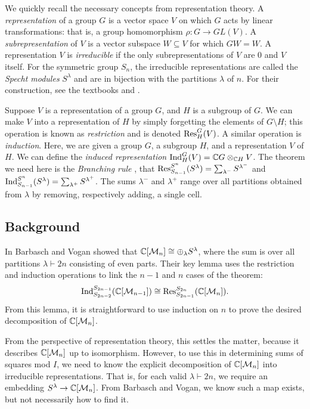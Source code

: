 We quickly recall the necessary concepts from representation theory.
A {\em representation} of a group $G$ is a vector space $V$ on which $G$ acts by linear transformations: that is, a group homomorphism $\rho: G \to GL(V)$.
A {\em subrepresentation} of $V$ is a vector subspace $W \subseteq V$ for which $GW = W$.
A representation $V$ is {\em irreducible} if the only subrepresentations of $V$ are 0 and $V$ itself.
For the symmetric group $S_n$, the irreducible representations are called the {\em Specht modules} $S^\lambda$ and are in bijection with the partitions $\lambda$ of $n$.
For their construction, see the textbooks \cite{Sagan} and \cite{Fulton}.

Suppose $V$ is a representation of a group $G$, and $H$ is a subgroup of $G$.
We can make $V$ into a representation of $H$ by simply forgetting the elements of $G \setminus H$; this operation is known as {\em restriction} and is denoted $\textup{Res}^G_H(V)$.
A similar operation is {\em induction}.
Here, we are given a group $G$, a subgroup $H$, and a representation $V$ of $H$.
We can define the {\em induced representation} $\textup{Ind}_H^G(V) = \mathbb CG\otimes_{\mathbb CH} V$.
The theorem we need here is the {\em Branching rule} \cite{Sagan}, that $\textup{Res}_{S_{n-1}}^{S^n}(S^\lambda) = \sum_{\lambda^-} S^{\lambda^-}$ and $\textup{Ind}_{S_{n-1}}^{S^n}(S^\lambda) = \sum_{\lambda^+} S^{\lambda^+}$.
The sums $\lambda^-$ and $\lambda^+$ range over all partitions obtained from $\lambda$ by removing, respectively adding, a single cell.

\subsection{Background}
In \cite{bv} Barbasch and Vogan showed that $\mathbb{C}[\mathcal{M}_{n}] \cong \oplus_\lambda S^\lambda$, where the sum is over all partitions $\lambda \vdash 2n$ consisting of even parts.
Their key lemma uses the restriction and induction operations to link the $n-1$ and $n$ cases of the theorem:
$$ \textup{Ind}_{S_{2n-2}}^{S_{2n-1}}(\mathbb{C}[\mathcal{M}_{n-1}]) \cong \textup{Res}_{S_{2n-1}}^{S_{2n}}( \mathbb{C}[\mathcal{M}_{n}]).$$ 
From this lemma, it is straightforward to use induction on $n$ to prove the desired decomposition of $\mathbb{C}[\mathcal{M}_{n}]$.

From the perspective of representation theory, this settles the matter, because it describes $\mathbb{C}[\mathcal{M}_{n}]$ up to isomorphism.
However, to use this in determining sums of squares mod $I$, we need to know the explicit decomposition of $\mathbb{C}[\mathcal{M}_{n}]$ into irreducible representations.
That is, for each valid $\lambda \vdash 2n$, we require an embedding $S^\lambda \to \mathbb{C}[\mathcal{M}_{n}]$.
From Barbasch and Vogan, we know such a map exists, but not necessarily how to find it.

